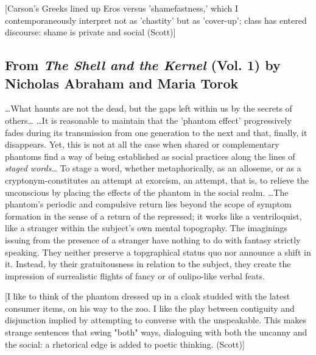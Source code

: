 \documentclass[
]{memoir}
\begin{document}
{[}Carson's Greeks lined up Eros versus 'shamefastness,' which I
contemporaneously interpret not as 'chastity' but as 'cover-up'; class
has entered discourse: shame is private and social (Scott){]}

\hypertarget{from-the-shell-and-the-kernel-vol.-1-by-nicholas-abraham-and-maria-torok}{%
\subsection*{\texorpdfstring{From \emph{The Shell and the Kernel} (Vol.
1) by Nicholas Abraham and Maria
Torok}{From The Shell and the Kernel (Vol. 1) by Nicholas Abraham and Maria Torok}}\label{from-the-shell-and-the-kernel-vol.-1-by-nicholas-abraham-and-maria-torok}}

\ldots{}What haunts are not the dead, but the gaps left within us by the
secrets of others\ldots{} \ldots{}It is reasonable to maintain that the
'phantom effect' progressively fades during its transmission from one
generation to the next and that, finally, it disappears. Yet, this is
not at all the case when shared or complementary phantoms find a way of
being established as social practices along the lines of \emph{staged
words}\ldots{} To stage a word, whether metaphorically, as an alloseme,
or as a cryptonym-constitutes an attempt at exorcism, an attempt, that
is, to relieve the unconscious by placing the effects of the phantom in
the social realm. \ldots{}The phantom's periodic and compulsive return
lies beyond the scope of symptom formation in the sense of a return of
the repressed; it works like a ventriloquist, like a stranger within the
subject's own mental topography. The imaginings issuing from the
presence of a stranger have nothing to do with fantasy strictly
speaking. They neither preserve a topgraphical status quo nor announce a
shift in it. Instead, by their gratuitousness in relation to the
subject, they create the impression of surrealistic flights of fancy or
of oulipo-like verbal feats.

{[}I like to think of the phantom dressed up in a cloak studded with the
latest consumer items, on his way to the zoo. I like the play between
contiguity and disjunction implied by attempting to converse with the
unspeakable. This makes strange sentences that swing "both" ways,
dialoguing with both the uncanny and the social: a rhetorical edge is
added to poetic thinking. (Scott){]}
\end{document}
